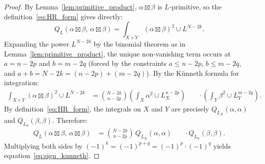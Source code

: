 \documentclass[aps,prd,twocolumn,superscriptaddress,nofootinbib]{revtex4-2}
\theoremstyle{definition}
\theoremstyle{remark}
\def\\{ }%
\begin{document}
\begin{proof}
By Lemma~\ref{lem:primitive_product}, $\alpha \boxtimes \beta$ is $L$-primitive, so the definition~\eqref{eq:HR_form} gives directly:
\[
Q_L(\alpha \boxtimes \beta,\, \alpha \boxtimes \beta) = \int_{X \times Y} (\alpha \boxtimes \beta)^2 \cup L^{N-2k}.
\]
Expanding the power $L^{N-2k}$ by the binomial theorem as in Lemma~\ref{lem:primitive_product}, the unique non-vanishing term occurs at $a = n - 2p$ and $b = m - 2q$ (forced by the constraints $a \leq n-2p$, $b \leq m-2q$, and $a + b = N - 2k = (n-2p) + (m-2q)$). By the Künneth formula for integration:
\[
\begin{aligned}
\int_{X \times Y}(\alpha \boxtimes \beta)^2 \cup L^{N-2k}
&= \binom{N-2k}{n-2p}
   \left(\int_X \alpha^2 \cup L_X^{n-2p}\right)\\
&\quad\cdot
   \left(\int_Y \beta^2 \cup L_Y^{m-2q}\right).
\end{aligned}
\]
By definition~\eqref{eq:HR_form}, the integrals on $X$ and $Y$ are precisely $Q_{L_X}(\alpha, \alpha)$ and $Q_{L_Y}(\beta, \beta)$. Therefore:
\[
\begin{aligned}
Q_L(\alpha \boxtimes \beta,\, \alpha \boxtimes \beta)
&= \binom{N-2k}{n-2p}\,
   Q_{L_X}(\alpha, \alpha)\\
&\quad\cdot Q_{L_Y}(\beta, \beta).
\end{aligned}
\]
Multiplying both sides by $(-1)^k = (-1)^{p+q} = (-1)^p \cdot (-1)^q$ yields equation~\eqref{eq:sign_kunneth}.
\end{proof}
\end{document}
